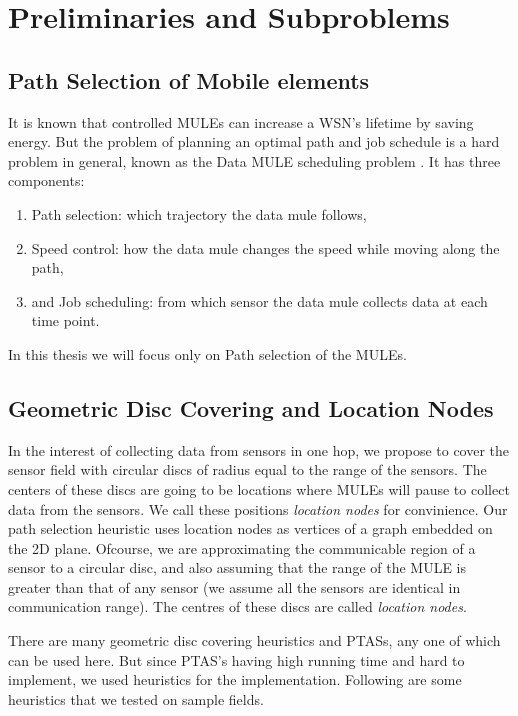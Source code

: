 \chapter{Preliminaries and Subproblems}
\label{chap:location_nodes}

\section{Path Selection of Mobile elements}
It is known that controlled MULEs can increase a WSN's lifetime by saving energy. But the problem of planning an optimal path and job schedule is a hard problem in general, known as the Data MULE scheduling problem \cite{dms}. It has three components:
\begin{enumerate}
\item Path selection: which trajectory the data mule follows,
\item Speed control: how the data mule changes the speed while moving along the path,
\item and Job scheduling: from which sensor the data mule collects data at each time point.
\end{enumerate}
In this thesis we will focus only on Path selection of the MULEs.

\section{Geometric Disc Covering and Location Nodes}

In the interest of collecting data from sensors in one hop, we propose to cover the sensor field with circular discs of radius equal to the range of the sensors. The centers of these discs are going to be locations where MULEs will pause to collect data from the sensors. We call these positions \emph{location nodes} for convinience. Our path selection heuristic uses location nodes as vertices of a graph embedded on the 2D plane. Ofcourse, we are approximating the communicable region of a sensor to a circular disc, and also assuming that the range of the MULE is greater than that of any sensor (we assume all the sensors are identical in communication range). The centres of these discs are called \emph{location nodes}.

There are many \cite{gmdc} \cite{shifting} geometric disc covering heuristics and PTASs, any one of which can be used here. But since PTAS's having high running time \cite{} and hard to implement, we used heuristics for the implementation. Following are some heuristics that we tested on sample fields.

